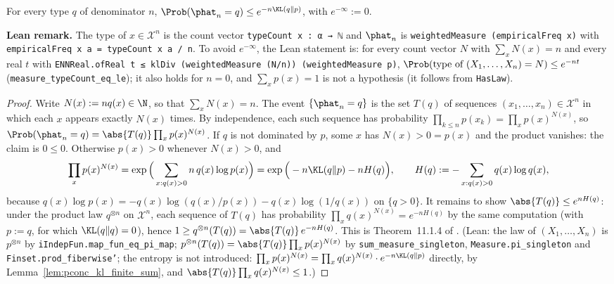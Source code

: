 \begin{lemma}\label{lem:type_prob_le}
\leanok
For every type $q$ of denominator $n$,
$\Prob(\phat_n = q) \le e^{-n \KL(q \| p)}$, with $e^{-\infty} := 0$.
\end{lemma}

\textbf{Lean remark.} The type of $x \in \mathcal X^n$ is the count vector
\texttt{typeCount x : α → ℕ} and $\phat_n$ is \texttt{weightedMeasure (empiricalFreq x)} with
\texttt{empiricalFreq x a = typeCount x a / n}. To avoid $e^{-\infty}$, the Lean statement is: for
every count vector $N$ with $\sum_x N(x) = n$ and every real $t$ with
\texttt{ENNReal.ofReal t ≤ klDiv (weightedMeasure (N/n)) (weightedMeasure p)},
$\Prob(\text{type of } (X_1, \dots, X_n) = N) \le e^{-nt}$ (\texttt{measure\_typeCount\_eq\_le}); it
also holds for $n = 0$, and $\sum_x p(x) = 1$ is not a hypothesis (it follows from
\texttt{HasLaw}).

\begin{proof}
\leanok
Write $N(x) := n q(x) \in \N$, so that $\sum_x N(x) = n$. The event $\{\phat_n = q\}$ is the
set $T(q)$ of sequences $(x_1, \dots, x_n) \in \mathcal X^n$ in which each $x$ appears exactly
$N(x)$ times. By independence, each such sequence has probability
$\prod_{k \le n} p(x_k) = \prod_x p(x)^{N(x)}$, so $\Prob(\phat_n = q) = \abs{T(q)} \prod_x p(x)^{N(x)}$.
If $q$ is not dominated by $p$, some $x$ has $N(x) > 0 = p(x)$ and the product vanishes: the
claim is $0 \le 0$. Otherwise $p(x) > 0$ whenever $N(x) > 0$, and
\[
  \prod_x p(x)^{N(x)} = \exp\Big(\sum_{x : q(x) > 0} n\, q(x) \log p(x)\Big)
  = \exp\Big(-n \KL(q \| p) - n H(q)\Big), \qquad H(q) := -\sum_{x : q(x) > 0} q(x) \log q(x),
\]
because $q(x) \log p(x) = -q(x) \log(q(x)/p(x)) - q(x)\log(1/q(x))$ on $\{q > 0\}$. It remains to
show $\abs{T(q)} \le e^{n H(q)}$: under the product law $q^{\otimes n}$ on $\mathcal X^n$, each
sequence of $T(q)$ has probability $\prod_x q(x)^{N(x)} = e^{-n H(q)}$ by the same computation
(with $p := q$, for which $\KL(q \| q) = 0$), hence
$1 \ge q^{\otimes n}(T(q)) = \abs{T(q)}\, e^{-n H(q)}$. This is Theorem~11.1.4 of
\cite{cover2006elements}. (Lean: the law of $(X_1, \dots, X_n)$ is $p^{\otimes n}$ by
\texttt{iIndepFun.map\_fun\_eq\_pi\_map}; $p^{\otimes n}(T(q)) = \abs{T(q)} \prod_x p(x)^{N(x)}$ by
\texttt{sum\_measure\_singleton}, \texttt{Measure.pi\_singleton} and \texttt{Finset.prod\_fiberwise'};
the entropy is not introduced: $\prod_x p(x)^{N(x)} = \prod_x q(x)^{N(x)} \cdot e^{-n\KL(q\|p)}$
directly, by Lemma~\ref{lem:pconc_kl_finite_sum}, and $\abs{T(q)} \prod_x q(x)^{N(x)} \le 1$.)
\end{proof}

